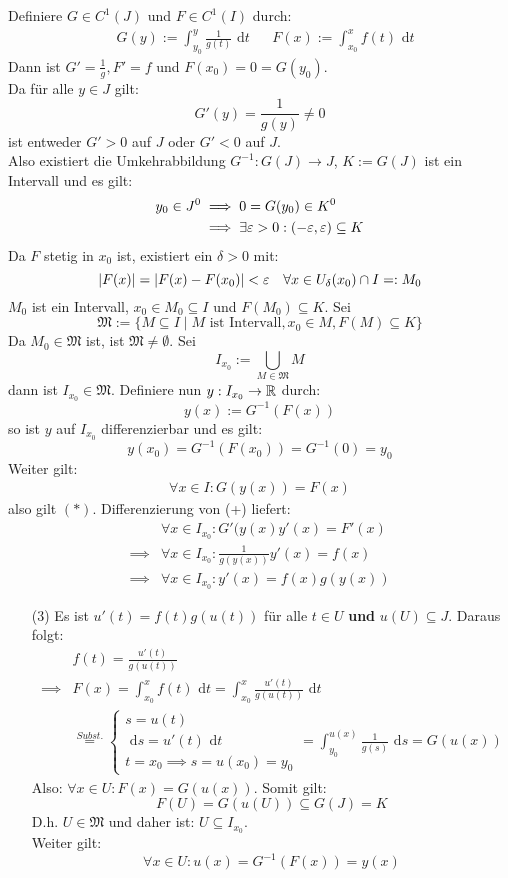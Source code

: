\documentclass[a4paper,twoside,DIV15,BCOR12mm,chapterprefix=true,headings=twolinechapter]{scrbook}
\begin{document}
\begin{beweis}
Definiere $G\in C^1(J)$ und $F\in C^1(I)$ durch:
\begin{align*}
&G(y):=\int_{y_0}^y \frac 1{g(t)}\text{ d}t &&F(x):=\int_{x_0}^x f(t)\text{ d}t
\end{align*}
Dann ist $G'=\frac 1g, F'=f$ und $F(x_0)=0=G(y_0)$.\\
Da für alle $y\in J$ gilt:
\[G'(y)=\frac 1{g(y)}\ne 0\] 
ist entweder $G'>0$ auf $J$ oder $G'<0$ auf $J$.\\
Also existiert die Umkehrabbildung $G^{-1}:G(J)\to J$, $K:=G(J)$ ist ein Intervall und es gilt:
\begin{align*}
y_0\in J^0&\implies 0=G(y_0)\in K^0\\
&\implies \exists \varepsilon>0:(-\varepsilon,\varepsilon)\subseteq K
\end{align*}
Da $F$ stetig in $x_0$ ist, existiert ein $\delta>0$ mit: 
\[|F(x)|=|F(x)-F(x_0)|<\varepsilon \quad \forall x\in U_\delta(x_0)\cap I=:M_0\]
$M_0$ ist ein Intervall, $x_0\in M_0\subseteq I$ und $F(M_0)\subseteq K$. Sei
\[\mathfrak{M}:=\{M\subseteq I\mid M \text{ ist Intervall},x_0\in M,F(M)\subseteq K\}\] 
Da $M_0\in\mathfrak{M}$ ist, ist $\mathfrak{M}\ne\emptyset$. Sei
\[I_{x_0}:=\bigcup_{M\in\mathfrak{M}} M\]
dann ist $I_{x_0}\in\mathfrak{M}$. Definiere nun $y:I_{x_0}\to\mathbb{R}$ durch:
\[y(x):=G^{-1}(F(x))\]
so ist $y$ auf $I_{x_0}$ differenzierbar und es gilt: 
\[y(x_0)=G^{-1}(F(x_0))=G^{-1}(0)=y_0\]
Weiter gilt:
\begin{align*}\forall x\in I: G(y(x))=F(x)\tag{+}\end{align*}
also gilt $(*)$.
Differenzierung von (+) liefert:
\begin{align*}
&\forall x\in I_{x_0}: G'(y(x)y'(x)=F'(x)\\
\implies &\forall x\in I_{x_0}: \frac 1{g(y(x))}y'(x)=f(x)\\
\implies &\forall x\in I_{x_0}: y'(x)=f(x)g(y(x))
\end{align*}
\begin{itemize}
\item[(3)] Es ist $u'(t)=f(t)g(u(t))$ für alle $t\in U$ \textbf{und} $u(U)\subseteq J$.
Daraus folgt:
\begin{align*}
&f(t)=\frac{u'(t)}{g(u(t))}\\
\implies &F(x)=\int_{x_0}^x f(t)\text{ d}t=\int_{x_0}^x \frac{u'(t)}{g(u(t))}\text{ d}t\\
&\stackrel{Subst.}{=}
\begin{cases}
s=u(t)\\
\text{ d}s= u'(t)\text{ d}t\\
t=x_0\implies s=u(x_0)=y_0
\end{cases}=\int_{y_0}^{u(x)}\frac 1{g(s)}\text{ d}s=G(u(x))
\end{align*}
Also: $\forall x\in U:F(x)=G(u(x))$. Somit gilt:
\[F(U)=G(u(U))\subseteq G(J)=K\]
D.h. $U\in\mathfrak{M}$ und daher ist: $U\subseteq I_{x_0}$.\\
Weiter gilt:
\[\forall x\in U: u(x)=G^{-1}(F(x))=y(x)\]
\end{itemize}
\end{beweis}
\end{document}
